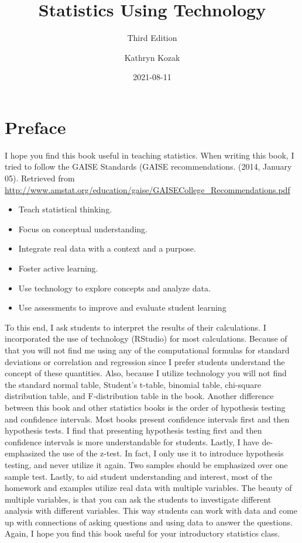 \documentclass[
]{book}
\title{Statistics Using Technology}
\subtitle{Third Edition}
\author{Kathryn Kozak}
\date{2021-08-11}
\providecommand{\tightlist}{%
  \setlength{\itemsep}{0pt}\setlength{\parskip}{0pt}}
\begin{document}
\maketitle

{
\setcounter{tocdepth}{1}
\tableofcontents
}
\hypertarget{preface}{%
\chapter*{Preface}\label{preface}}

I hope you find this book useful in teaching statistics. When writing this book, I tried to follow the GAISE Standards (GAISE recommendations. (2014, January 05). Retrieved from \url{http://www.amstat.org/education/gaise/GAISECollege_Recommendations.pdf}

\begin{itemize}
\tightlist
\item
  Teach statistical thinking.
\item
  Focus on conceptual understanding.
\item
  Integrate real data with a context and a purpose.
\item
  Foster active learning.
\item
  Use technology to explore concepts and analyze data.
\item
  Use assessments to improve and evaluate student learning
\end{itemize}

To this end, I ask students to interpret the results of their calculations. I incorporated the use of technology (RStudio) for most calculations. Because of that you will not find me using any of the computational formulas for standard deviations or correlation and regression since I prefer students understand the concept of these quantities. Also, because I utilize technology you will not find the standard normal table, Student's t-table, binomial table, chi-square distribution table, and F-distribution table in the book. Another difference between this book and other statistics books is the order of hypothesis testing and confidence intervals. Most books present confidence intervals first and then hypothesis tests. I find that presenting hypothesis testing first and then confidence intervals is more understandable for students. Lastly, I have de-emphasized the use of the z-test. In fact, I only use it to introduce hypothesis testing, and never utilize it again. Two samples should be emphasized over one sample test. Lastly, to aid student understanding and interest, most of the homework and examples utilize real data with multiple variables. The beauty of multiple variables, is that you can ask the students to investigate different analysis with different variables. This way students can work with data and come up with connections of asking questions and using data to answer the questions. Again, I hope you find this book useful for your introductory statistics class.
\end{document}
